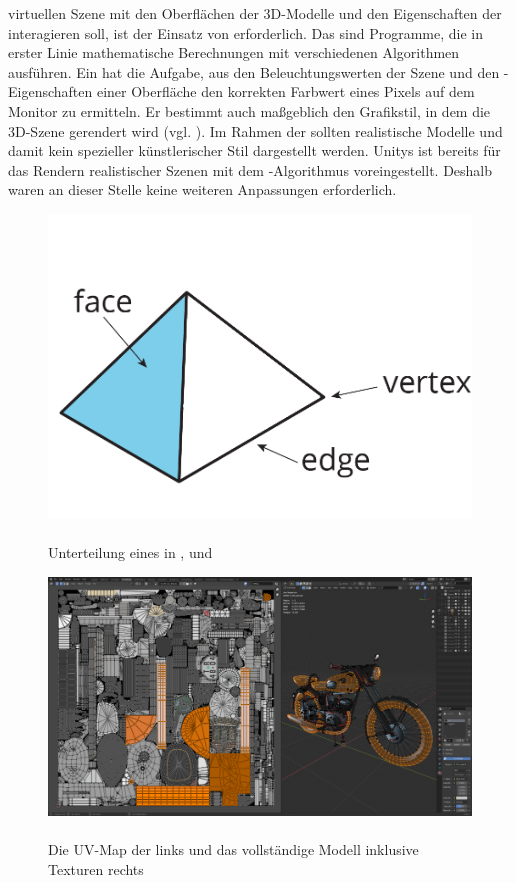 virtuellen Szene mit den Oberflächen der 3D-Modelle und den Eigenschaften der  interagieren soll, ist der Einsatz von  erforderlich. Das sind Programme, die in erster Linie mathematische Berechnungen mit verschiedenen Algorithmen ausführen. Ein  hat die Aufgabe, aus den Beleuchtungswerten der Szene und den -Eigenschaften einer Oberfläche den korrekten Farbwert eines Pixels auf dem Monitor zu ermitteln. Er bestimmt auch maßgeblich den Grafikstil, in dem die 3D-Szene gerendert wird (vgl. \cite{res.14.01.2021}). Im Rahmen der \mapp sollten realistische Modelle und damit kein spezieller künstlerischer Stil dargestellt werden. Unitys  ist bereits für das Rendern realistischer Szenen  mit dem -Algorithmus voreingestellt. Deshalb waren an dieser Stelle keine weiteren Anpassungen erforderlich.
	\begin{figure}
		\centering
		\includegraphics[width=0.6\linewidth]{images/polyhedra-edge-face-vertex}
		\captionsetup{justification=raggedright,singlelinecheck=false} %
		\caption[polygon]{\\Unterteilung eines  in ,  und  \cite{oml.14.05.2020}}
		\label{fig:polyhedra-edge-face-vertex}
	\end{figure}
	\begin{figure}
		\centering
		\includegraphics[width=0.9\linewidth]{images/uv_map}
		\caption[uv_map]{\\Die UV-Map der  links und das vollständige Modell inklusive Texturen rechts}
		\label{fig:uv_map}
	\end{figure}
